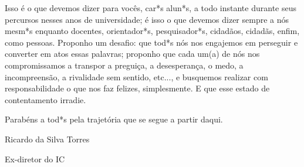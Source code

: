 Isso é o que devemos dizer para vocês, car*s alun*s, a todo instante durante
seus percursos nesses anos de universidade; é isso o que devemos dizer sempre a
nós mesm*s enquanto docentes, orientador*s, pesquisador*s, cidadãos, cidadãs, enfim, como
pessoas. Proponho um desafio: que tod*s nós nos engajemos em perseguir e
converter em atos essas palavras; proponho que cada um(a) de nós nos compromissamos
a transpor a preguiça, a desesperança, o medo, a incompreensão, a rivalidade sem
sentido, etc..., e busquemos realizar com responsabilidade o que nos faz
felizes, simplesmente. E que esse estado de contentamento irradie.

Parabéns a tod*s pela trajetória que se segue a partir daqui.

\begin{flushright}
Ricardo da Silva Torres

Ex-diretor do IC

\end{flushright}
